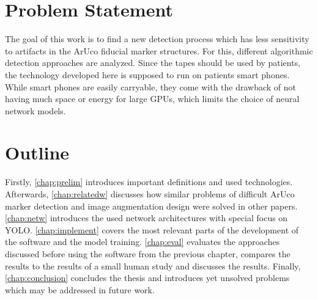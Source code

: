 \documentclass[10pt]{book}
\begin{document}

\section{Problem Statement}

The goal of this work is to find a new detection process which has less sensitivity to artifacts in the \ac{ArUco} fiducial marker structures. For this, different algorithmic detection approaches are analyzed. Since the tapes should be used by patients, the technology developed here is supposed to run on patients smart phones. While smart phones are easily carryable, they come with the drawback of not having much space or energy for large \acp{GPU}, which limits the choice of neural network models.

\section{Outline}

Firstly, \autoref{chap:prelim} introduces important definitions and used technologies. Afterwards, \autoref{chap:relatedw} discusses how similar problems of difficult \ac{ArUco} marker detection and image augmentation design were solved in other papers. \autoref{chap:netw} introduces the used network architectures with special focus on \ac{YOLO}. \autoref{chap:implement} covers the most relevant parts of the development of the software and the model training. \autoref{chap:eval} evaluates the approaches discussed before using the software from the previous chapter, compares the results to the results of a small human study and discusses the results. Finally, \autoref{chap:conclusion} concludes the thesis and introduces yet unsolved problems which may be addressed in future work.
\end{document}
